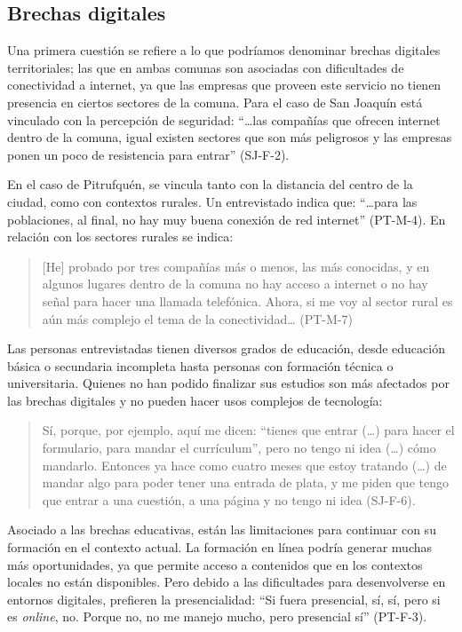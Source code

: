 \subsection{Brechas digitales}\label{sub-sec-brechasdigitales}

Una primera cuestión se refiere a lo que podríamos denominar brechas
digitales territoriales; las que en ambas comunas son asociadas con
dificultades de conectividad a internet, ya que las empresas que proveen
este servicio no tienen presencia en ciertos sectores de la comuna. Para
el caso de San Joaquín está vinculado con la percepción de seguridad:
\enquote{\ldots las compañías que ofrecen internet dentro de la comuna, igual
	existen sectores que son más peligrosos y las empresas ponen un poco de
	resistencia para entrar} (SJ-F-2).

En el caso de Pitrufquén, se vincula tanto con la distancia del centro
de la ciudad, como con contextos rurales. Un entrevistado indica que:
\enquote{\ldots para las poblaciones, al final, no hay muy buena conexión de red
	internet} (PT-M-4). En relación con los sectores rurales se indica:

\begin{quote}
	{[}He{]} probado por tres compañías más o menos, las más conocidas, y en
	algunos lugares dentro de la comuna no hay acceso a internet o no hay
	señal para hacer una llamada telefónica. Ahora, si me voy al sector
	rural es aún más complejo el tema de la conectividad\ldots{} (PT-M-7)
\end{quote}

Las personas entrevistadas tienen diversos grados de educación, desde
educación básica o secundaria incompleta hasta personas con formación
técnica o universitaria. Quienes no han podido finalizar sus estudios
son más afectados por las brechas digitales y no pueden hacer usos
complejos de tecnología:

\begin{quote}
	Sí, porque, por ejemplo, aquí me dicen: \enquote{tienes que entrar (\ldots) para
		hacer el formulario, para mandar el currículum}, pero no tengo ni idea
	(\ldots) cómo mandarlo. Entonces ya hace como cuatro meses que estoy
	tratando (\ldots) de mandar algo para poder tener una entrada de plata, y
	me piden que tengo que entrar a una cuestión, a una página y no tengo ni
	idea (SJ-F-6).
\end{quote}

Asociado a las brechas educativas, están las limitaciones para continuar
con su formación en el contexto actual. La formación en línea podría
generar muchas más oportunidades, ya que permite acceso a contenidos que
en los contextos locales no están disponibles. Pero debido a las
dificultades para desenvolverse en entornos digitales, prefieren la
presencialidad: \enquote{Si fuera presencial, sí, sí, pero si es \emph{online},
	no. Porque no, no me manejo mucho, pero presencial sí} (PT-F-3).

